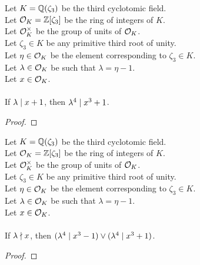 \begin{lemma}
    \label{lmm:lambda_pow_four_dvd_cube_add_one_of_dvd_add_one}
    \leanok
    Let $K = \mathbb{Q}(\zeta_3)$ be the third cyclotomic field. \\
    Let $\mathcal{O}_K = \mathbb{Z}[\zeta_3]$ be the ring of integers of $K$. \\
    Let $\mathcal{O}^\times_K$ be the group of units of $\mathcal{O}_K$. \\
    Let $\zeta_3 \in K$ be any primitive third root of unity. \\
    Let $\eta \in \mathcal{O}_K$ be the element corresponding to $\zeta_3 \in K$. \\
    Let $\lambda \in \mathcal{O}_K$ be such that $\lambda = \eta -1$. \\
    Let $x \in \mathcal{O}_K$. \\\\
    If $\lambda \mid x + 1$, then $\lambda^4 \mid x ^ 3 + 1$.
\end{lemma}
\begin{proof}
    \leanok
\end{proof}

\begin{lemma}
    \label{lmm:lambda_pow_four_dvd_cube_sub_one_or_add_one_of_lambda_not_dvd}
    \leanok
    Let $K = \mathbb{Q}(\zeta_3)$ be the third cyclotomic field. \\
    Let $\mathcal{O}_K = \mathbb{Z}[\zeta_3]$ be the ring of integers of $K$. \\
    Let $\mathcal{O}^\times_K$ be the group of units of $\mathcal{O}_K$. \\
    Let $\zeta_3 \in K$ be any primitive third root of unity. \\
    Let $\eta \in \mathcal{O}_K$ be the element corresponding to $\zeta_3 \in K$. \\
    Let $\lambda \in \mathcal{O}_K$ be such that $\lambda = \eta -1$. \\
    Let $x \in \mathcal{O}_K$. \\\\
    If $\lambda \nmid x$, then $(\lambda^4 \mid x^3 - 1)
    \lor (\lambda^4 \mid x ^ 3 + 1)$.
\end{lemma}
\begin{proof}
    \leanok
\end{proof}
